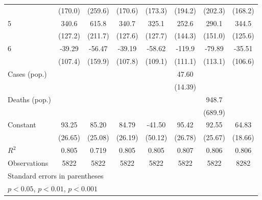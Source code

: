 \documentclass{article}
\begin{document}
{\begin{longtable}{l*{7}{c}}
                &  (170.0)         &  (259.6)         &  (170.6)         &  (173.3)         &  (194.2)         &  (202.3)         &  (168.2)         \\
5               &    340.6\sym{*}  &    615.8\sym{**} &    340.7\sym{*}  &    325.1\sym{*}  &    252.6         &    290.1         &    344.5\sym{**} \\
                &  (127.2)         &  (211.7)         &  (127.6)         &  (127.7)         &  (144.3)         &  (151.0)         &  (125.6)         \\
6               &   -39.29         &   -56.47         &   -39.19         &   -58.62         &   -119.9         &   -79.89         &   -35.51         \\
                &  (107.4)         &  (159.9)         &  (107.8)         &  (109.1)         &  (111.1)         &  (113.1)         &  (106.6)         \\
Cases (pop.)    &                  &                  &                  &                  &    47.60\sym{**} &                  &                  \\
                &                  &                  &                  &                  &  (14.39)         &                  &                  \\
Deaths (pop.)   &                  &                  &                  &                  &                  &    948.7         &                  \\
                &                  &                  &                  &                  &                  &  (689.9)         &                  \\
Constant        &    93.25\sym{**} &    85.20\sym{**} &    84.79\sym{**} &   -41.50         &    95.42\sym{***}&    92.55\sym{***}&    64.83\sym{**} \\
                &  (26.65)         &  (25.08)         &  (26.19)         &  (50.12)         &  (26.78)         &  (25.67)         &  (18.66)         \\
\hline
\(R^{2}\)       &    0.805         &    0.719         &    0.805         &    0.805         &    0.807         &    0.806         &    0.806         \\
Observations    &     5822         &     5822         &     5822         &     5822         &     5822         &     5822         &     8282         \\
\hline\hline
\multicolumn{8}{l}{\footnotesize Standard errors in parentheses}\\
\multicolumn{8}{l}{\footnotesize \sym{*} \(p<0.05\), \sym{**} \(p<0.01\), \sym{***} \(p<0.001\)}\\
\end{longtable}
}
\end{document}
